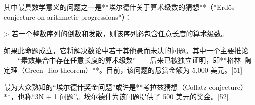 其中最具数学意义的问题之一是**埃尔德什关于算术级数的猜想**（*Erdős conjecture on arithmetic progressions*）：

> 若一个整数序列的倒数和发散，则该序列必包含任意长度的算术级数。

如果此命题成立，它将解决数论中若干其他悬而未决的问题。其中一个主要推论——“素数集合中存在任意长度的算术级数”——后来已被独立证明，即**格林–陶定理（Green–Tao theorem）**。目前，该问题的悬赏金额为 5,000 美元。[51]

最为大众熟知的“埃尔德什奖金问题”或许是**考拉兹猜想（Collatz conjecture）**，也称“3N + 1 问题”。埃尔德什为该问题提供了 500 美元的奖金。[52]
